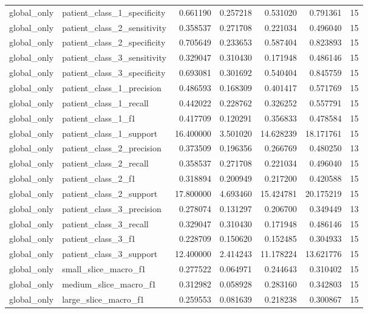 \begin{tabular}{llrrrrr}
global_only & patient_class_1_specificity & 0.661190 & 0.257218 & 0.531020 & 0.791361 & 15 \\
global_only & patient_class_2_sensitivity & 0.358537 & 0.271708 & 0.221034 & 0.496040 & 15 \\
global_only & patient_class_2_specificity & 0.705649 & 0.233653 & 0.587404 & 0.823893 & 15 \\
global_only & patient_class_3_sensitivity & 0.329047 & 0.310430 & 0.171948 & 0.486146 & 15 \\
global_only & patient_class_3_specificity & 0.693081 & 0.301692 & 0.540404 & 0.845759 & 15 \\
global_only & patient_class_1_precision & 0.486593 & 0.168309 & 0.401417 & 0.571769 & 15 \\
global_only & patient_class_1_recall & 0.442022 & 0.228762 & 0.326252 & 0.557791 & 15 \\
global_only & patient_class_1_f1 & 0.417709 & 0.120291 & 0.356833 & 0.478584 & 15 \\
global_only & patient_class_1_support & 16.400000 & 3.501020 & 14.628239 & 18.171761 & 15 \\
global_only & patient_class_2_precision & 0.373509 & 0.196356 & 0.266769 & 0.480250 & 13 \\
global_only & patient_class_2_recall & 0.358537 & 0.271708 & 0.221034 & 0.496040 & 15 \\
global_only & patient_class_2_f1 & 0.318894 & 0.200949 & 0.217200 & 0.420588 & 15 \\
global_only & patient_class_2_support & 17.800000 & 4.693460 & 15.424781 & 20.175219 & 15 \\
global_only & patient_class_3_precision & 0.278074 & 0.131297 & 0.206700 & 0.349449 & 13 \\
global_only & patient_class_3_recall & 0.329047 & 0.310430 & 0.171948 & 0.486146 & 15 \\
global_only & patient_class_3_f1 & 0.228709 & 0.150620 & 0.152485 & 0.304933 & 15 \\
global_only & patient_class_3_support & 12.400000 & 2.414243 & 11.178224 & 13.621776 & 15 \\
global_only & small_slice_macro_f1 & 0.277522 & 0.064971 & 0.244643 & 0.310402 & 15 \\
global_only & medium_slice_macro_f1 & 0.312982 & 0.058928 & 0.283160 & 0.342803 & 15 \\
global_only & large_slice_macro_f1 & 0.259553 & 0.081639 & 0.218238 & 0.300867 & 15 \\

\end{tabular}
